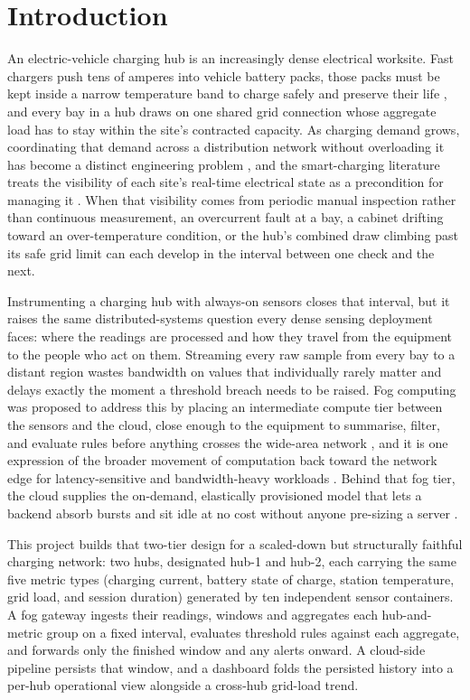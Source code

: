 \documentclass[conference]{IEEEtran}
\begin{document}
\section{Introduction}

An electric-vehicle charging hub is an increasingly dense electrical worksite. Fast chargers push tens of amperes into vehicle battery packs, those packs must be kept inside a narrow temperature band to charge safely and preserve their life \cite{ref2}, and every bay in a hub draws on one shared grid connection whose aggregate load has to stay within the site's contracted capacity. As charging demand grows, coordinating that demand across a distribution network without overloading it has become a distinct engineering problem \cite{ref11}, and the smart-charging literature treats the visibility of each site's real-time electrical state as a precondition for managing it \cite{ref1}. When that visibility comes from periodic manual inspection rather than continuous measurement, an overcurrent fault at a bay, a cabinet drifting toward an over-temperature condition, or the hub's combined draw climbing past its safe grid limit can each develop in the interval between one check and the next.

Instrumenting a charging hub with always-on sensors \cite{ref12} closes that interval, but it raises the same distributed-systems question every dense sensing deployment faces: where the readings are processed and how they travel from the equipment to the people who act on them. Streaming every raw sample from every bay to a distant region wastes bandwidth on values that individually rarely matter and delays exactly the moment a threshold breach needs to be raised. Fog computing was proposed to address this by placing an intermediate compute tier between the sensors and the cloud, close enough to the equipment to summarise, filter, and evaluate rules before anything crosses the wide-area network \cite{ref3, ref13}, and it is one expression of the broader movement of computation back toward the network edge for latency-sensitive and bandwidth-heavy workloads \cite{ref4, ref14}. Behind that fog tier, the cloud supplies the on-demand, elastically provisioned model that lets a backend absorb bursts and sit idle at no cost without anyone pre-sizing a server \cite{ref5}.

This project builds that two-tier design for a scaled-down but structurally faithful charging network: two hubs, designated hub-1 and hub-2, each carrying the same five metric types (charging current, battery state of charge, station temperature, grid load, and session duration) generated by ten independent sensor containers. A fog gateway ingests their readings, windows and aggregates each hub-and-metric group on a fixed interval, evaluates threshold rules against each aggregate, and forwards only the finished window and any alerts onward. A cloud-side pipeline persists that window, and a dashboard folds the persisted history into a per-hub operational view alongside a cross-hub grid-load trend.
\end{document}
